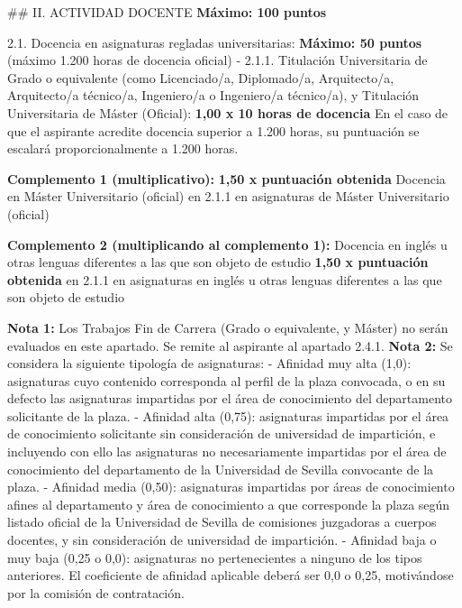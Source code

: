\documentclass{article}
\begin{document}
\begin{itemize}
\begin{itemize}
\begin{scriptsize}
                  \#\# II. ACTIVIDAD DOCENTE                                                                     \textbf{Máximo: 100 puntos}

                  2.1. Docencia en asignaturas regladas universitarias:                                     \textbf{Máximo: 50 puntos}
                  (máximo 1.200 horas de docencia oficial)
                  - 2.1.1. Titulación Universitaria de Grado o equivalente (como Licenciado/a, Diplomado/a, Arquitecto/a, Arquitecto/a técnico/a, Ingeniero/a o Ingeniero/a técnico/a), y Titulación Universitaria de Máster (Oficial):
                  \textbf{1,00 x 10 horas de docencia}
                  En el caso de que el aspirante acredite docencia superior a 1.200 horas, su puntuación se escalará proporcionalmente a 1.200 horas.

                  \textbf{Complemento 1 (multiplicativo):}                             \textbf{1,50 x puntuación obtenida}
                  Docencia en Máster Universitario (oficial)                  en 2.1.1 en asignaturas de Máster Universitario (oficial)

                  \textbf{Complemento 2 (multiplicando al complemento 1):}
                  Docencia en inglés u otras lenguas diferentes a las que son objeto de estudio                                      \textbf{1,50 x puntuación obtenida}
                  en 2.1.1 en asignaturas en inglés u otras lenguas diferentes a las que son objeto de estudio

                  \textbf{Nota 1:} Los Trabajos Fin de Carrera (Grado o equivalente, y Máster) no serán evaluados en este apartado. Se remite al aspirante al apartado 2.4.1.
                  \textbf{Nota 2:} Se considera la siguiente tipología de asignaturas:
                  - Afinidad muy alta (1,0): asignaturas cuyo contenido corresponda al perfil de la plaza convocada, o en su defecto las asignaturas impartidas por el área de conocimiento del departamento solicitante de la plaza.
                  - Afinidad alta  (0,75): asignaturas impartidas por el área de conocimiento solicitante sin consideración de universidad de impartición, e incluyendo con ello las asignaturas no necesariamente impartidas por el área de conocimiento del departamento de la Universidad de Sevilla convocante de la plaza.
                  - Afinidad media  (0,50): asignaturas impartidas por áreas de conocimiento afines al departamento y área de conocimiento a que corresponde la plaza según listado oficial de la Universidad de Sevilla de comisiones juzgadoras a cuerpos docentes, y sin consideración de universidad de impartición.
                  - Afinidad baja o muy baja      (0,25 o 0,0): asignaturas no pertenecientes a ninguno de los tipos anteriores. El coeficiente de afinidad aplicable deberá ser 0,0 o 0,25, motivándose por la comisión de contratación.


\end{scriptsize}
\end{itemize}
\end{itemize}
\end{document}
